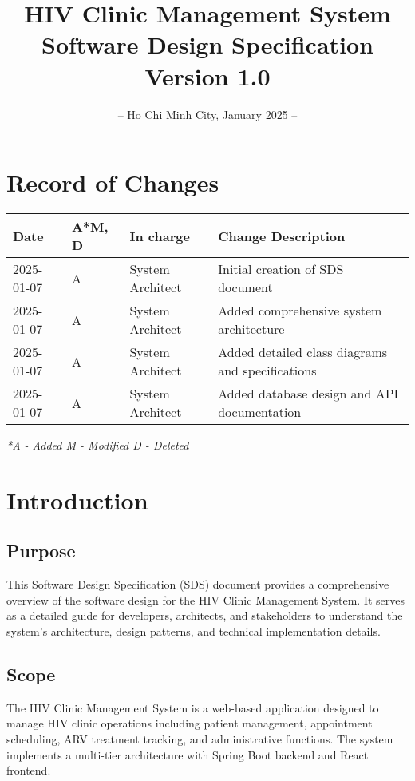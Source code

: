 \documentclass[12pt,a4paper]{article}
\title{
    \vspace{-2cm}
    \Huge\textbf{HIV Clinic Management System}\\
    \vspace{1cm}
    \Large\textbf{Software Design Specification}\\
    \vspace{2cm}
    \normalsize Version 1.0
}
\author{}
\date{
    \vspace{4cm}
    – Ho Chi Minh City, January 2025 –
}
\begin{document}
\maketitle
\thispagestyle{empty}

\newpage

\section*{Record of Changes}
\begin{longtable}{|p{3cm}|p{2cm}|p{3cm}|p{6cm}|}
\hline
\textbf{Date} & \textbf{A*M, D} & \textbf{In charge} & \textbf{Change Description} \\
\hline
2025-01-07 & A & System Architect & Initial creation of SDS document \\
\hline
2025-01-07 & A & System Architect & Added comprehensive system architecture \\
\hline
2025-01-07 & A & System Architect & Added detailed class diagrams and specifications \\
\hline
2025-01-07 & A & System Architect & Added database design and API documentation \\
\hline
\end{longtable}

\textit{*A - Added M - Modified D - Deleted}

\newpage

\tableofcontents

\newpage

\section{Introduction}

\subsection{Purpose}
This Software Design Specification (SDS) document provides a comprehensive overview of the software design for the HIV Clinic Management System. It serves as a detailed guide for developers, architects, and stakeholders to understand the system's architecture, design patterns, and technical implementation details.

\subsection{Scope}
The HIV Clinic Management System is a web-based application designed to manage HIV clinic operations including patient management, appointment scheduling, ARV treatment tracking, and administrative functions. The system implements a multi-tier architecture with Spring Boot backend and React frontend.
\end{document}
